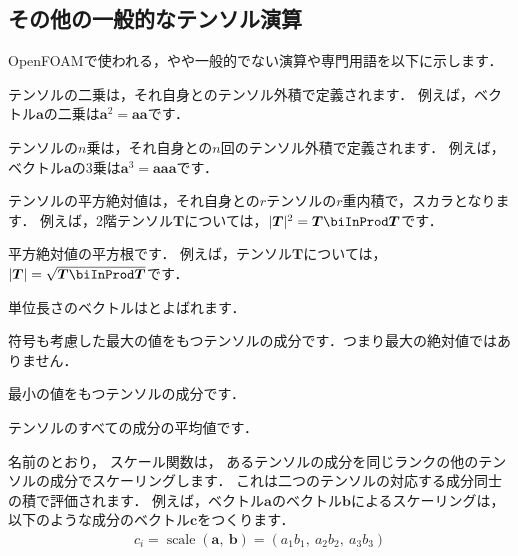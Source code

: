 \subsection{その他の一般的なテンソル演算}
\label{ssec:1.3.6}
OpenFOAMで使われる，やや一般的でない演算や専門用語を以下に示します．
\begin{description}
%
 \item[二乗] テンソルの二乗は，それ自身とのテンソル外積で定義されます．
            例えば，ベクトル$\bm{a}$の二乗は$\bm{a}^{2} = \bm{a}\bm{a}$です．
%
 \item[$n$乗] テンソルの$n$乗は，それ自身との$n$回のテンソル外積で定義されます．
            例えば，ベクトル$\bm{a}$の$3$乗は$\bm{a}^{3} = \bm{a}\bm{a}\bm{a}$です．
%
 \item[平方絶対値] テンソルの平方絶対値は，それ自身との$r$テンソルの$r$重内積で，スカラとなります．
            例えば，2階テンソル$\bm{T}$については，$|\bm{T}|^{2} = \bm{T} \biInProd \bm{T}$です．
%
 \item[絶対値] 平方絶対値の平方根です．
            例えば，テンソル$\bm{T}$については，$|\bm{T}| = \sqrt{\bm{T} \biInProd \bm{T}}$です．
            
%
単位長さのベクトルはとよばれます．
%
 \item[最大成分] 符号も考慮した最大の値をもつテンソルの成分です．つまり最大の絶対値ではありません．
%
 \item[最小成分] 最小の値をもつテンソルの成分です．
%
 \item[成分平均値] テンソルのすべての成分の平均値です．
 \item[スケール] 名前のとおり，
%
スケール関数は，
            あるテンソルの成分を同じランクの他のテンソルの成分でスケーリングします．
            これは二つのテンソルの対応する成分同士の積で評価されます．
            例えば，ベクトル$\bm{a}$のベクトル$\bm{b}$によるスケーリングは，
            以下のような成分のベクトル$\bm{c}$をつくります．
            \begin{align}
             \label{eq:1.24}
             c_{i} = \mathop{\mathrm{scale}}(\bm{a},\ \bm{b})
             = (a_{1}b_{1},\ a_{2}b_{2},\ a_{3}b_{3})
            \end{align}
\end{description}


